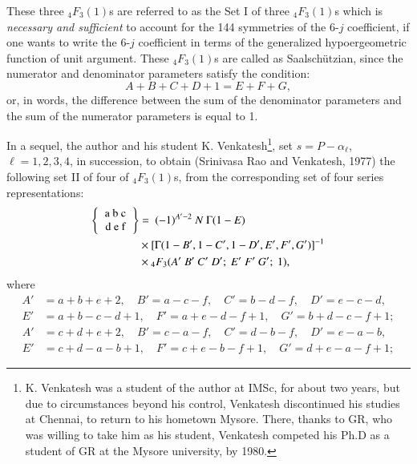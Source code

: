 These three ${}_4F_3(1)$s are referred to as the Set I of three ${}_4F_3(1)$s which is \textit{necessary and sufficient} to account for the 144 symmetries of the 6-$j$ coefficient, if one wants to write the 6-$j$ coefficient in terms of the generalized hypoergeometric function of unit argument. These ${}_4F_3(1)$s are called as Saalschützian, since the numerator and denominator parameters satisfy the condition:
\begin{equation}
A+B+C+D+1 = E+F+G, \label{chap29-eq36}
\end{equation}
or, in words, the difference between the sum of the denominator parameters and the sum of the numerator parameters is equal to 1.

In a sequel, the author and his student K. Venkatesh\footnote{K. Venkatesh was a student of the author at IMSc, for about two years, but due to circumstances beyond his control, Venkatesh discontinued his studies at Chennai, to return to his hometown Mysore. There, thanks to GR, who was willing to take him as his student, Venkatesh competed his Ph.D as a student of GR at the Mysore university, by 1980.}, set $s = P-\alpha_\ell$, $\ell=1,2,3,4$, in succession, to obtain (Srinivasa Rao and Venkatesh, 1977) the following set II of four of $_4F_3(1)$s, from the corresponding set of four series representations:
\begin{equation}
\begin{split}
\left\{
\begin{tabular} {c} 
a\ b\ c\\ 
d\ e\ f \\ 
\end{tabular} 
\right\}
& = \ (-1)^{A'-2}\ N\ \Gamma(1-E)\\
& \times [\Gamma(1-B', 1-C', 1-D', E', F', G')]^{-1}\\
& \times {}_4F_3(A'\ B'\ C'\ D';\ E'\ F'\ G';\ 1), \label{chap29-eq37}
\end{split}
\end{equation}
where
\begin{equation}
\begin{split}
A' & = a+b+e+2, \quad B'=a-c-f, \quad C'=b-d-f, \quad D'=e-c-d,\\
E' & = a+b-c-d+1, \quad F'=a+e-d-f+1, \quad G'=b+d-c-f+1;\label{chap29-eq38}
\end{split}
\end{equation}
\begin{equation}
\begin{split}
A' & = c+d+e+2, \quad B'=c-a-f, \quad C'=d-b-f, \quad D'=e-a-b,\\
E' & = c+d-a-b+1, \quad F'=c+e-b-f+1, \quad G'=d+e-a-f+1;\label{chap29-eq39}
\end{split}
\end{equation}
